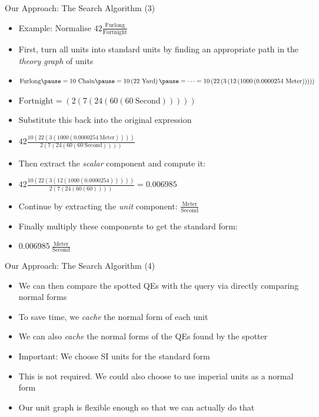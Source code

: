 \documentclass{beamer}
\begin{document}
  \begin{frame}{Our Approach: The Search Algorithm (3)}
    \begin{itemize}[<+->]
      \item Example: Normalise $42 \frac{\text{Furlong}}{\text{Fortnight}}$
      \item First, turn all units into standard units by finding an appropriate path in the \textit{theory graph} of units
      \item $\text{Furlong} \pause = 10\ \text{Chain} \pause = 10 \left( 22\ \text{Yard}\right) \pause = \dots = 10 \left( 22 \left( 3 \left( 12 \left( 1000 \left( 0.0000254\ \text{Meter} \right) \right) \right) \right)\right) $
      \item $\text{Fortnight} = \left( 2 \left( 7 \left( 24 \left( 60 \left( 60\ \text{Second} \right) \right) \right) \right) \right) $
      \item Substitute this back into the original expression
      \item $42 \frac{10 \left( 22 \left( 3 \left( 1000 \left( 0.0000254\ \text{Meter} \right) \right) \right)\right)}{ 2 \left( 7 \left( 24 \left( 60 \left( 60\ \text{Second} \right) \right) \right) \right)}$
      \item Then extract the \textit{scalar} component and compute it:
      \item $ 42 \frac{10 \left( 22 \left( 3 \left( 12 \left( 1000 \left( 0.0000254 \right) \right) \right) \right)\right)}{ 2 \left( 7 \left( 24 \left( 60 \left( 60\right) \right) \right) \right)} = 0.006985 $
      \item Continue by extracting the \textit{unit} component: $\frac{\text{Meter}}{\text{Second}}$
      \item Finally multiply these components to get the standard form:
      \item $0.006985\ \frac{\text{Meter}}{\text{Second}}$
    \end{itemize}
  \end{frame}

  \begin{frame}{Our Approach: The Search Algorithm (4)}
    \begin{itemize}[<+->]
      \item We can then compare the spotted QEs with the query via directly comparing normal forms
      \item To save time, we \textit{cache} the normal form of each unit
      \item We can also \textit{cache} the normal forms of the QEs found by the spotter
      \item Important: We choose SI units for the standard form
      \item This is not required. We could also choose to use imperial units as a normal form
      \item Our unit graph is flexible enough so that we can actually do that
    \end{itemize}
  \end{frame}
\end{document}
